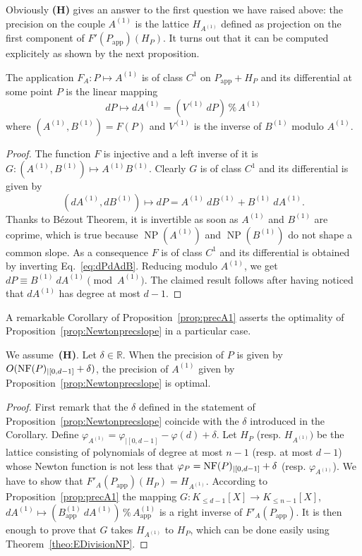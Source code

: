 \documentclass{sig-alternate-05-2015}
\DeclareMathOperator{\NP}{NP}
\newcommand{\R}{\mathbb R}
\newcommand{\NF}{\text{\rm NF}}
\renewcommand{\mod}{\,\%\,}
\newcommand{\app}{\textrm{app}}
\begin{document}
\bigskip

\noindent
Obviously \textbf{(H)} gives an answer to the first question we have 
raised above: the precision on the couple $A^{(1)}$ is the lattice 
$H_{A^{(1)}}$ defined as projection on the first component of 
$F'(P_\app)(H_P)$. It turns out that it can be computed explicitely as 
shown by the next proposition.

\begin{prop}
\label{prop:precA1}
The application $F_A : P \mapsto A^{(1)}$ is of class $C^1$ on $P_\app + H_P$
and its differential at some point $P$ is the linear mapping
$$dP \mapsto dA^{(1)} = (V^{(1)} \: dP) \mod A^{(1)}$$
where $(A^{(1)}, B^{(1)}) = F(P)$ and $V^{(1)}$ is the inverse of 
$B^{(1)}$ modulo $A^{(1)}$.
\end{prop}

\begin{proof}
The function $F$ is injective and a left inverse of it is
$G : (A^{(1)},B^{(1)}) \mapsto A^{(1)}B^{(1)}$.
Clearly $G$ is of class $C^1$ and its differential is given by
\begin{equation}
\label{eq:dPdAdB}
(dA^{(1)}, dB^{(1)}) \mapsto dP = A^{(1)} \: dB^{(1)} + B^{(1)} \: dA^{(1)}.
\end{equation}
Thanks to Bézout Theorem, it is invertible as soon as $A^{(1)}$ and 
$B^{(1)}$ are coprime, which is true because $\NP(A^{(1)})$ and 
$\NP(B^{(1)})$ do not shape a common slope. As a consequence $F$ is of 
class $C^1$ and its differential is obtained by inverting 
Eq.~\eqref{eq:dPdAdB}. Reducing modulo $A^{(1)}$, we get $dP \equiv 
B^{(1)} \: dA^{(1)} \pmod {A^{(1)}}$. The claimed result follows after 
having noticed that $dA^{(1)}$ has degree at most $d{-}1$.
\end{proof}

A remarkable Corollary of Proposition~\ref{prop:precA1} asserts the
optimality of Proposition~\ref{prop:Newtonprecslope} in a particular 
case.

\begin{cor}
We assume~\textbf{(H)}. Let $\delta \in \R$.
When the precision of $P$ is given by $O(\NF(P)_{|[0,d-1]} + \delta)$,
the precision of $A^{(1)}$ given by 
Proposition~\ref{prop:Newtonprecslope} is optimal.
\end{cor}

\begin{proof}
First remark that the $\delta$ defined in the statement of 
Proposition~\ref{prop:Newtonprecslope} coincide with the $\delta$
introduced in the Corollary. Define
$\varphi_{A^{(1)}} = \varphi_{|[0,d{-}1]} - \varphi(d) + \delta$.
Let $H_P$ (resp. $H_{A^{(1)}})$ be the lattice consisting of
polynomials of degree at most $n{-}1$ (resp. at most $d{-}1$)
whose Newton function is not less that $\varphi_P = \NF(P)_{|[0,d-1]} + \delta$ (resp. 
$\varphi_{A^{(1)}}$). We have to show that $F'_A(P_\app)(H_P) = 
H_{A^{(1)}}$. According to Proposition~\ref{prop:precA1}
the mapping $G : K_{\leq d{-}1}[X] \to K_{\leq n{-}1}[X]$,
$dA^{(1)} \mapsto (B_\app^{(1)} \: dA^{(1)}) \mod A_\app^{(1)}$
is a right inverse of $F'_A(P_\app)$. It is then enough to prove
that $G$ takes $H_{A^{(1)}}$ to $H_P$, which can be done easily
using Theorem~\ref{theo:EDivisionNP}.
\end{proof}
\end{document}
